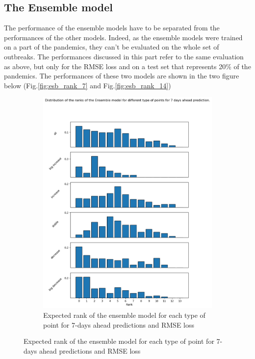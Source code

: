 \subsection{The Ensemble model}
The performance of the ensemble models have to be separated from the performances of the other models. 
Indeed, as the ensemble models were trained on a part of the pandemics, they can't be evaluated on the whole set of outbreaks. 
The performances discussed in this part refer to the same evaluation as above, but only for the RMSE loss and on a test set that represents 20\% of the pandemics. 
The performances of these two models are shown in the two figure below (Fig.\ref{fig:esb_rank_7} and Fig.\ref{fig:esb_rank_14})

\begin{figure}[htbp]
    \centering
    \begin{subfigure}[b]{0.45\textwidth}
        \centering
        \includegraphics[width=\textwidth]{figures/esb_rank_7.png}
        \caption{Expected rank of the ensemble model for each type of point for 7-days ahead predictions and RMSE loss}

\end{subfigure}
\end{figure}
